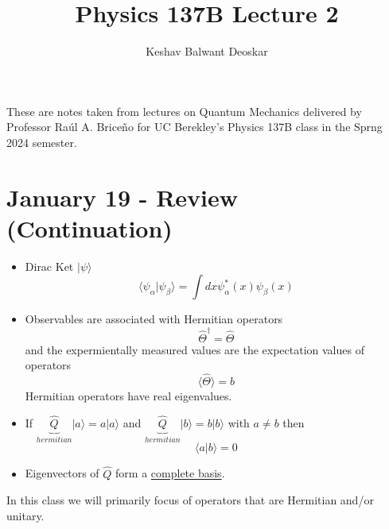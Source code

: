 \documentclass{article}
\title{Physics 137B Lecture 2}
\author{Keshav Balwant Deoskar}
\newcommand{\ket}[1]{|#1 \rangle}
\newcommand{\inner}[2]{\langle #1 | #2 \rangle}
\newcommand{\mean}[1]{\langle #1 \rangle}
\begin{document}
\maketitle

These are notes taken from lectures on Quantum Mechanics delivered by Professor Raúl A. Briceño for UC Berekley's Physics 137B class in the Sprng 2024 semester.

\tableofcontents

\pagebreak

\section{January 19 - Review (Continuation)}

\begin{itemize}
  \item Dirac Ket $\ket{\psi}$
  \[ \inner{\psi_{\alpha}}{\psi_{\beta}} = \int dx \psi_{\alpha}^{*}(x) \psi_{\beta}(x) \]

  \item Observables are associated with Hermitian operators 
  \[ \hat{\Theta}^{\dagger} = \hat{\Theta} \]
  and the expermientally measured values are the expectation values of operators\[ \mean{\hat{\Theta}} = b \] Hermitian operators have real eigenvalues.

  \item If $\underbrace{\hat{Q}}_{hermitian} \ket{a} = a \ket{a}$ and $\underbrace{\hat{Q}}_{hermitian} \ket{b} = b \ket{b}$ with $a \neq b$ then 
  \[ \inner{a}{b} = 0 \]
  
  \item Eigenvectors of $\hat{Q}$ form a \underline{complete basis}.
\end{itemize}

\vskip 0.5cm
In this class we will primarily focus of operators that are Hermitian and/or unitary.
\end{document}
